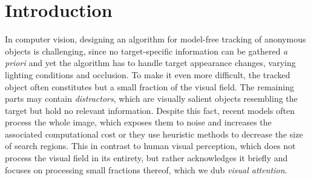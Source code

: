 \section{Introduction}
    
    
	
    In computer vision, designing an algorithm for model-free tracking of anonymous objects is challenging, since no target-specific information can be gathered \emph{a priori} and yet the algorithm has to handle target appearance changes, varying lighting conditions and occlusion. 
    To make it even more difficult, the tracked object often constitutes but a small fraction of the visual field. 
    The remaining parts may contain \emph{distractors}, which are visually salient objects resembling the target but hold no relevant information. 
    Despite this fact, recent models often process the whole image,
    which exposes them to noise
    and increases the associated computational cost or they use heuristic methods to decrease the size of search regions. 
    This in contrast to human visual perception, which does not process the visual field in its entirety, but rather acknowledges it briefly and focuses on processing small fractions thereof, which we dub \emph{visual attention}.
    
